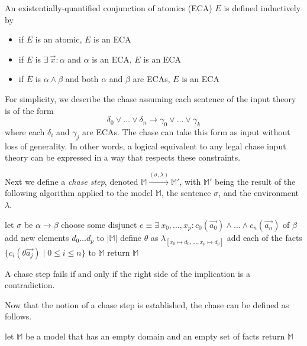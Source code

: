 		An existentially-quantified conjunction of atomics (ECA) $E$ is defined
		inductively by
		\begin{itemize}
		\item if $E$ is an atomic, $E$ is an ECA
		\item if $E$ is $\exists\ \vec{x} : \alpha$ and $\alpha$ is an ECA, $E$ is an ECA
		\item if $E$ is $\alpha \wedge \beta$ and both $\alpha$ and $\beta$ are ECAs, $E$ is an ECA
		\end{itemize}
		For simplicity, we describe the chase assuming each sentence of the
		input theory is of the form
			\[
			\delta_0 \vee\ldots\vee \delta_n \to \gamma_0 \vee\ldots\vee \gamma_k
			\]
		where each $\delta_i$ and $\gamma_j$ are ECAs. The chase can take this
		form as input without loss of generality. In other words, a logical
		equivalent to any legal chase input theory can be expressed in a way
		that respects these constraints.

		Next we define a \emph{chase step}, denoted $\mathbb{M}
		\xrightarrow{(\sigma,\lambda)} \mathbb{M}'$, with $\mathbb{M'}$ being
		the result of the following algorithm applied to the model
		$\mathbb{M}$, the sentence $\sigma$, and the environment $\lambda$.

		\begin{algorithm}[H]
		\DontPrintSemicolon
		let $\sigma$ be $\alpha \to \beta$ \;
		choose some disjunct $e \equiv \exists\ x_0,\ldots,x_p : c_0(\vec{a_0}) \wedge\ldots\wedge c_n(\vec{a_n})$ of $\beta$ \;
		add new elements $d_0 \ldots d_p$ to $|\mathbb{M}|$ \;
		define $\theta$ as $\lambda_{[x_0 \mapsto d_0 , \ldots , x_p \mapsto d_p]}$ \;
		add each of the facts $\{c_i(\theta\vec{a_j}) \mid 0 \le i \le n \}$ to $\mathbb{M}$ \;
		return $\mathbb{M}$ \;
		\end{algorithm}

		A chase step fails if and only if the right side of the
		implication is a contradiction.

		Now that the notion of a chase step is established, the chase can be
		defined as follows.

		\begin{algorithm}[H]
		\DontPrintSemicolon
		let $\mathbb{M}$ be a model that has an empty domain and an empty set of facts \;
		return $\mathbb{M}$
		\end{algorithm}

